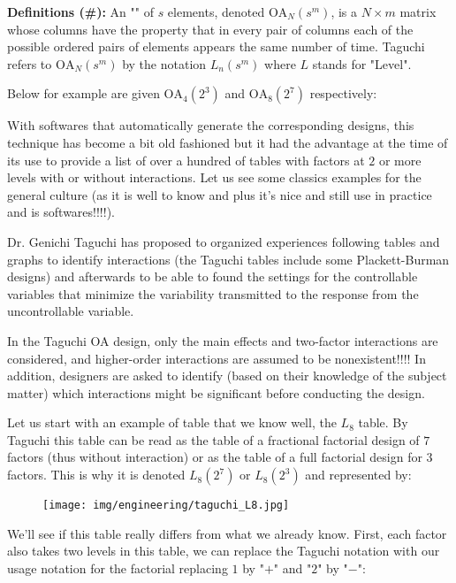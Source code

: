 	\textbf{Definitions (\#\mydef):} An ""  of $s$ elements, denoted $\text{OA}_N(s^m)$, is a $N\times m$ matrix whose columns have the property that in every pair of columns each of the possible ordered pairs of elements appears the same number of time. Taguchi refers to $\text{OA}_N(s^m)$ by the notation $L_n(s^m)$ where $L$ stands for "Level".
	
	Below for example are given $\text{OA}_4(2^3)$ and $\text{OA}_8(2^7)$ respectively:
	
	
	With softwares that automatically generate the corresponding designs, this technique has become a bit old fashioned but it had the advantage at the time of its use to provide a list of over a hundred of tables with factors at $2$ or more levels with or without interactions. Let us see some classics examples  for the general culture (as it is well to know and plus it's nice and still use in practice and is softwares!!!!).
	
	Dr. Genichi Taguchi has proposed to organized experiences following tables and graphs to identify interactions (the Taguchi tables include some Plackett-Burman designs) and afterwards to be able to found the settings for the controllable variables that minimize the variability transmitted to the response from the uncontrollable variable.
	
	In the Taguchi OA design, only the main effects and two-factor interactions are considered, and higher-order interactions are assumed to be nonexistent!!!! In addition, designers are asked to identify (based on their knowledge of the subject matter) which interactions might be significant before conducting the design.

	Let us start with an example of table that we know well, the $L_8$ table. By Taguchi this table can be read as the table of a fractional factorial design of $7$ factors (thus without interaction) or  as the table of a full factorial design for $3$ factors. This is why it is denoted $L_8(2^7)$ or $L_8(2^3)$ and represented by:
	
	\begin{figure}[H]
		\begin{center}
		\texttt{[image: img/engineering/taguchi\_L8.jpg]}
		\end{center}	
	\end{figure}
	We'll see if this table really differs from what we already know. First, each factor also takes two levels in this table, we can replace the Taguchi notation with our usage notation for the factorial replacing $1$ by "$+$" and "$2$" by "$-$":
	
